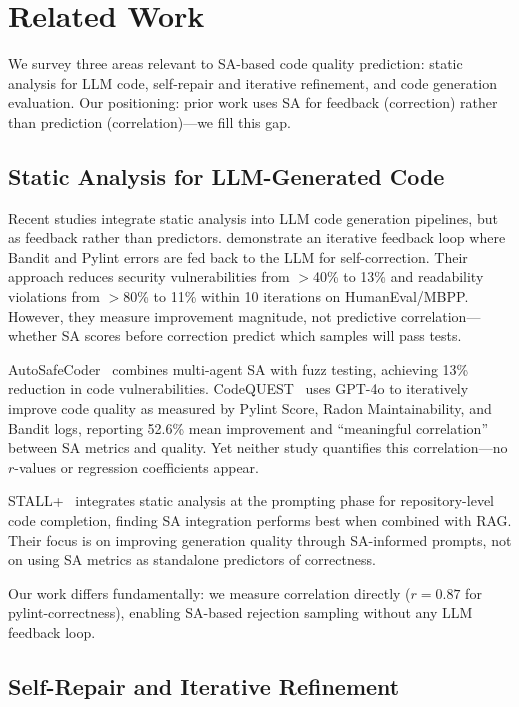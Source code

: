 \section{Related Work}
\label{sec:related}

We survey three areas relevant to SA-based code quality prediction: static analysis for LLM code, self-repair and iterative refinement, and code generation evaluation. Our positioning: prior work uses SA for feedback (correction) rather than prediction (correlation)---we fill this gap.

\subsection{Static Analysis for LLM-Generated Code}

Recent studies integrate static analysis into LLM code generation pipelines, but as feedback rather than predictors. \citet{Blyth2025Static} demonstrate an iterative feedback loop where Bandit and Pylint errors are fed back to the LLM for self-correction. Their approach reduces security vulnerabilities from $>$40\% to 13\% and readability violations from $>$80\% to 11\% within 10 iterations on HumanEval/MBPP. However, they measure improvement magnitude, not predictive correlation---whether SA scores before correction predict which samples will pass tests.

AutoSafeCoder~\citep{Nunez2024AutoSafeCoder} combines multi-agent SA with fuzz testing, achieving 13\% reduction in code vulnerabilities. CodeQUEST~\citep{Liu2025CodeQUEST} uses GPT-4o to iteratively improve code quality as measured by Pylint Score, Radon Maintainability, and Bandit logs, reporting 52.6\% mean improvement and ``meaningful correlation'' between SA metrics and quality. Yet neither study quantifies this correlation---no $r$-values or regression coefficients appear.

STALL+~\citep{Liu2024STALL} integrates static analysis at the prompting phase for repository-level code completion, finding SA integration performs best when combined with RAG. Their focus is on improving generation quality through SA-informed prompts, not on using SA metrics as standalone predictors of correctness.

Our work differs fundamentally: we measure correlation directly ($r=0.87$ for pylint-correctness), enabling SA-based rejection sampling without any LLM feedback loop.

\subsection{Self-Repair and Iterative Refinement}

